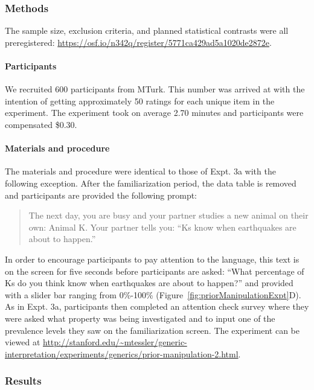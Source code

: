 \documentclass[floatsintext,doc]{apa6}
\theoremstyle{definition}
\theoremstyle{definition}
\theoremstyle{definition}
\theoremstyle{remark}
\begin{document}
\subsubsection{Methods}\label{methods-3}

The sample size, exclusion criteria, and planned statistical contrasts
were all preregistered:
\url{https://osf.io/n342q/register/5771ca429ad5a1020de2872e}.

\paragraph{Participants}\label{participants-5}

We recruited 600 participants from MTurk. This number was arrived at
with the intention of getting approximately 50 ratings for each unique
item in the experiment. The experiment took on average 2.70 minutes and
participants were compensated \$0.30.

\paragraph{Materials and procedure}\label{materials-and-procedure}

The materials and procedure were identical to those of Expt. 3a with the
following exception. After the familiarization period, the data table is
removed and participants are provided the following prompt:

\begin{quote}
The next day, you are busy and your partner studies a new animal on
their own: Animal K. Your partner tells you: \enquote{Ks know when
earthquakes are about to happen.}
\end{quote}

In order to encourage participants to pay attention to the language,
this text is on the screen for five seconds before participants are
asked: \enquote{What percentage of Ks do you think know when earthquakes
are about to happen?} and provided with a slider bar ranging from
0\%-100\% (Figure~\ref{fig:priorManipulationExpt}D). As in Expt. 3a,
participants then completed an attention check survey where they were
asked what property was being investigated and to input one of the
prevalence levels they saw on the familiarization screen. The experiment
can be viewed at
\url{http://stanford.edu/~mtessler/generic-interpretation/experiments/generics/prior-manipulation-2.html}.

\subsubsection{Results}\label{results-4}
\end{document}

